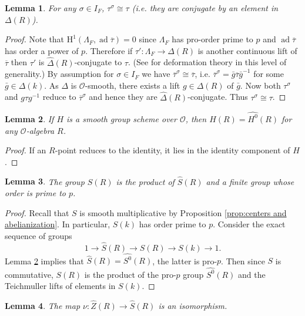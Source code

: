 \documentclass[11pt, letterpaper,english]{amsart}
\theoremstyle{plain}
\newtheorem{lem}{Lemma}
\theoremstyle{definition}
\numberwithin{equation}{section}
\numberwithin{lem}{section}
\newcommand{\cO}{\mathcal{O}}
\newcommand{\taubar}{{\overline{\tau}}}
\DeclareMathOperator{\ad}{ad}
\newcommand{\Ld}{\Lambda}
\newcommand{\Dt}{\Delta}
\begin{document}
\begin{lem}\label{isomorphism}
For any $\sigma \in I_F$, $\tau^{\sigma} \cong \tau$ (i.e. they are conjugate by an element in $\Dt(R)$).
\end{lem}
\begin{proof}
Note that $\mathrm{H}^1(\Ld_F, \ad \taubar)=0$ since $\Ld_F$ has pro-order prime to $p$ and $\ad \taubar$ has order a power of $p$.  Therefore if $\tau': \Ld_F \to \Dt(R)$ is another continuous lift of $\taubar$ then $\tau'$ is $\widehat{\Dt}(R)$-conjugate to $\tau$.  (See \cite[\S3]{tilouine96} for deformation theory in this level of generality.)
By assumption for $\sigma \in I_F$ we have  $\taubar^{\sigma} \cong \taubar$, i.e. $\taubar^{\sigma} = \bar g \taubar \bar g^{-1}$ for some $\bar g \in \Dt(k)$.   As $\Dt$ is $\cO$-smooth, there exists a lift $g \in \Dt(R)$ of $\bar g$. Now both $\tau^{\sigma}$ and $g \tau g^{-1}$ reduce to $\taubar^{\sigma}$ and hence they are $\widehat \Dt(R)$-conjugate.  Thus $\tau^\sigma \cong \tau$.
\end{proof}

\begin{lem} \label{lem:identityhat}
If $H$ is a smooth group scheme over $\cO$, 
then $\widehat{H}(R)=\widehat{H^0}(R)$ for any $\cO$-algebra $R$.
\end{lem}

\begin{proof}
If an $R$-point reduces to the identity, it lies in the identity component of $H$. 
\end{proof}

\begin{lem}\label{lem:decomposition of S}
The group $S(R)$ is the product of $\widehat{S}(R)$ and a finite group whose order is prime to $p$.  
\end{lem}

\begin{proof}
Recall that $S$ is smooth multiplicative by Proposition \ref{prop:centers and abelianization}. In particular, $S(k)$ has order prime to $p$.
Consider the exact sequence of groups
\[ 1 \to \widehat S(R) \to S(R) \to S(k) \to 1. \] 
Lemma \ref{lem:identityhat} implies that $\widehat S(R)=\widehat{S^0}(R)$, the latter is pro-$p$. 
Then since $S$ is commutative, $S(R)$ is the product of the pro-$p$ group $\widehat{S^0}(R)$ and the Teichmuller lifts of elements in $S(k)$.
\end{proof}

\begin{lem}\label{lem:isogeny of tori}
The map $\nu \colon \widehat{Z}(R) \to \widehat{S}(R)$ is an isomorphism.
\end{lem}
\end{document}

